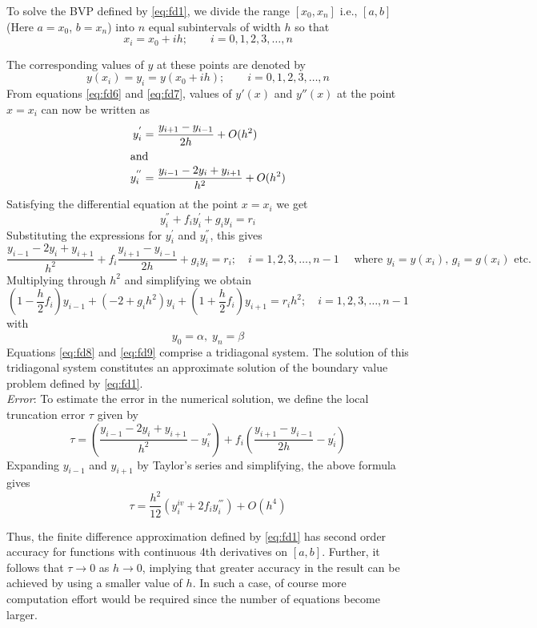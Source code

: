 \documentclass[../main-sheet.tex]{subfiles}
\begin{document}
To solve the BVP defined by \eqref{eq:fd1}, we divide the range \([x_0,x_n]\) i.e., \([a,b]\) (Here \(a=x_0\), \(b=x_n\)) into \(n\) equal subintervals of width \(h\) so that 
\[x_i=x_0+ih;\qquad i=0,1,2,3,\dots,n\]


The corresponding values of \(y\) at these points are denoted by 
\[y(x_i)=y_i=y(x_0+ih);\qquad i=0,1,2,3,\dots,n\]
From equations \eqref{eq:fd6} and \eqref{eq:fd7}, values of \(y'(x)\) and \(y''(x)\) at the point \(x=x_i\) can now be written as
\begin{align*}
    y_i^{'}&=\frac{y_{i+1}-y_{i-1}}{2h}+O(h^2)\\
    \intertext{and}
    y_i^{''}&=\frac{y_{i-1}-2y_{i}+y_{i+1}}{h^2}+O(h^2)
\end{align*}
Satisfying the differential equation at the point \(x=x_i\) we get
\[
    y_{i}^{''}+f_iy_i^{'}+g_iy_i=r_i
\]
Substituting the expressions for \(y_i^{'}\) and \(y_i^{''}\), this gives
\[
    \frac{y_{i-1}-2y_{i}+y_{i+1}}{h^2}+f_i\frac{y_{i+1}-y_{i-1}}{2h}+g_iy_i=r_i;\quad i=1,2,3,\dots,n-1\quad \text{ where } y_i=y(x_i),\,g_i=g(x_i)\text{ etc.}
\]
Multiplying through \(h^2\) and simplifying we obtain
\begin{equation}
    \left( 1-\frac{h}{2}f_i \right)y_{i-1}+\left( -2+g_ih^2 \right)y_i+\left( 1+\frac{h}{2}f_i \right)y_{i+1}=r_i h^2;\quad i=1,2,3,\dots,n-1
    \label{eq:fd8}
\end{equation}
with 
\begin{equation}
    y_0=\alpha,\;y_n=\beta
    \label{eq:fd9}
\end{equation}
Equations \eqref{eq:fd8} and \eqref{eq:fd9} comprise a tridiagonal system. The solution of this tridiagonal system constitutes an approximate solution of the boundary value problem defined by \eqref{eq:fd1}.\\


\emph{Error}: To estimate the error in the numerical solution, we define the local truncation error \(\tau\) given by 
\[
    \tau=\left( \frac{y_{i-1}-2y_i+y_{i+1}}{h^2} -y_i^{''}\right)+f_i\left( \frac{y_{i+1}-y_{i-1}}{2h} -y_i^{'}\right)
\]
Expanding \(y_{i-1}\) and \(y_{i+1}\) by Taylor's series and simplifying, the above formula gives
\begin{equation}
    \tau=\frac{h^2}{12}\left( y_i^{iv}+ 2f_iy_i^{'''} \right)+O(h^4)
    \label{eq:fd10}
\end{equation}


Thus, the finite difference approximation defined by \eqref{eq:fd1} has second order accuracy for functions with continuous 4th derivatives on \([a,b]\). Further, it follows that \(\tau\to 0\) as \(h\to 0\), implying that greater accuracy in the result can be achieved by using a smaller value of \(h\). In such a case, of course more computation effort would be required since the number of equations become larger.
\end{document}

